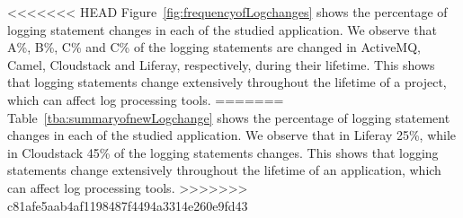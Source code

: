 %

<<<<<<< HEAD
Figure~\ref{fig:frequencyofLogchanges} shows the percentage of logging statement changes in each of the studied application. We observe that A\%, B\%, C\% and C\% of the logging statements are changed in ActiveMQ, Camel, Cloudstack and Liferay, respectively, during their lifetime. This shows that logging statements change extensively throughout the lifetime of a project, which can affect log processing tools.
=======
Table~\ref{tba:summaryofnewLogchange} shows the percentage of logging statement changes in each of the studied application. We observe that in Liferay 25\%, while in Cloudstack 45\% of the logging statements changes. This shows that logging statements change extensively throughout the lifetime of an application, which can affect log processing tools.
>>>>>>> c81afe5aab4af1198487f4494a3314e260e9fd43

%	
%		


